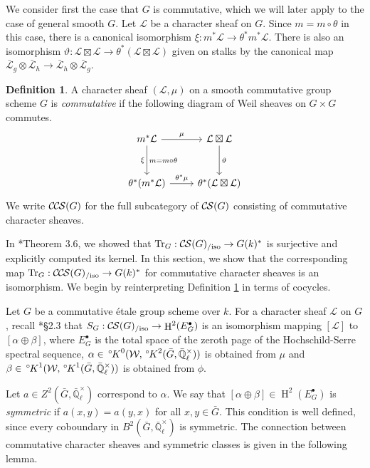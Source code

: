 \documentclass[10pt]{amsart}
\theoremstyle{plain}
\theoremstyle{definition}
\newtheorem{definition}[theorem]{Definition}
\newcommand{\EE}{\mathbb{\bar Q}_\ell}
\newcommand{\EEx}{\EE^\times}
\newcommand{\Weil}[1]{\mathcal{W}_{#1}}
\DeclareMathOperator{\Hh}{H}
\DeclareMathOperator{\Tr}{Tr}
\newcommand{\TrFrob}[1]{\Tr_{#1}}
\newcommand{\cs}[1]{{\mathcal{#1}}}
\newcommand{\gcs}[1]{{\mathcal{\bar #1}}}
\newcommand{\CS}{{\mathcal{C\hskip-0.8pt S}}}
\newcommand{\CCS}{{\mathcal{C\hskip-.8pt C\hskip-0.8pt S}}}
\newcommand{\CSiso}[1]{\CS(#1)_{/\text{iso}}}
\newcommand{\CCSiso}[1]{\CCS(#1)_{/\text{iso}}}
\newcommand{\bG}{\bar{G}}
\newcommand{\oK}{{\,^\circ \hskip-1pt K}}
\begin{document}
We consider first the case that $G$ is commutative, which we will later apply to the case of general smooth $G$.
Let $\cs{L}$ be a character sheaf on $G$.  Since $m = m \circ \theta$ in this case,
there is a canonical isomorphism $\xi : m^* \cs{L} \to \theta^* m^* \cs{L}$.
There is also an isomorphism $\vartheta : \cs{L}\boxtimes\cs{L} \to \theta^*(\cs{L}\boxtimes\cs{L})$
given on stalks by the canonical map $\gcs{L}_{g} \otimes \gcs{L}_{h} \to \gcs{L}_{h} \otimes \gcs{L}_{g}$.

\begin{definition}\label{def:CCScom}
A character sheaf $(\cs{L}, \mu)$ on a smooth commutative group scheme $G$ is \emph{commutative}
if the following diagram of Weil sheaves on $G \times G$ commutes.
  \[
  \begin{tikzcd}[row sep=30]
   m^*\cs{L} \arrow{d}[swap]{\xi}{m= m\circ\theta} \arrow{r}{\mu} & \cs{L}\boxtimes\cs{L} \arrow{d}{\vartheta}\\
   \theta^*(m^*\cs{L}) \arrow{r}{{\theta}^*\mu} &  \theta^*(\cs{L}\boxtimes\cs{L})
  \end{tikzcd}
  \]
We write $\CCS(G)$ for the full subcategory of $\CS(G)$ consisting of commutative character sheaves.
 \end{definition}

In \cite{cunningham-roe:13a}*{Theorem 3.6}, we showed that $\TrFrob{G} : \CSiso{G} \to G(k)^*$ is surjective and
explicitly computed its kernel.  In this section, we show that the corresponding map
$\TrFrob{G} : \CCSiso{G} \to G(k)^*$ for commutative character sheaves is an isomorphism.
We begin by reinterpreting Definition \ref{def:CCScom} in terms of cocycles.

Let $G$ be a commutative \'etale group scheme over $k$. For a character sheaf $\cs{L}$ on $G$, recall
\cite{cunningham-roe:13a}*{\S 2.3} that $S_G : \CSiso{G} \to \Hh^2(E_G^\bullet)$ is an isomorphism mapping
$[\cs{L}]$ to $[\alpha \oplus \beta]$, where $E_G^\bullet$ is the total space of the zeroth page
of the Hochschild-Serre spectral sequence, $\alpha \in \oK^0(\Weil{}, \oK^2(\bG, \EEx))$ is obtained from $\mu$ and
$\beta \in \oK^1(\Weil{}, \oK^1(\bG, \EEx))$ is obtained from $\phi$.

Let $a \in Z^2(\bG, \EEx)$ correspond to $\alpha$.  We say that $[\alpha \oplus \beta] \in \Hh^2(E_G^\bullet)$
is \emph{symmetric} if $a(x,y) = a(y,x)$ for all $x,y \in \bG$.  This condition is well defined, since every
coboundary in $B^2(\bG, \EEx)$ is symmetric.  The connection between commutative character sheaves
and symmetric classes is given in the following lemma.
\end{document}

